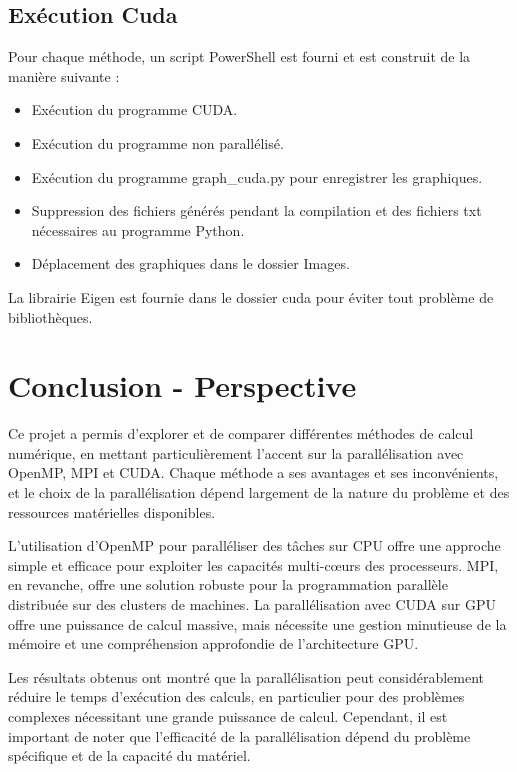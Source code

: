 \documentclass[10pt,a4paper]{article}
\begin{document}
\subsection{Exécution Cuda}
Pour chaque méthode, un script PowerShell est fourni et est construit de la manière suivante :
\begin{itemize}
\item Exécution du programme CUDA.
\item Exécution du programme non parallélisé.
\item Exécution du programme graph\_cuda.py pour enregistrer les graphiques.
\item Suppression des fichiers générés pendant la compilation et des fichiers txt nécessaires au programme Python.
\item Déplacement des graphiques dans le dossier Images.

\end{itemize}

La librairie Eigen est fournie dans le dossier cuda pour éviter tout problème de bibliothèques.

\newpage
\section{Conclusion - Perspective}
Ce projet a permis d'explorer et de comparer différentes méthodes de calcul numérique, en mettant particulièrement l'accent sur la parallélisation avec OpenMP, MPI et CUDA. Chaque méthode a ses avantages et ses inconvénients, et le choix de la parallélisation dépend largement de la nature du problème et des ressources matérielles disponibles.

L'utilisation d'OpenMP pour paralléliser des tâches sur CPU offre une approche simple et efficace pour exploiter les capacités multi-cœurs des processeurs. MPI, en revanche, offre une solution robuste pour la programmation parallèle distribuée sur des clusters de machines. La parallélisation avec CUDA sur GPU offre une puissance de calcul massive, mais nécessite une gestion minutieuse de la mémoire et une compréhension approfondie de l'architecture GPU.

Les résultats obtenus ont montré que la parallélisation peut considérablement réduire le temps d'exécution des calculs, en particulier pour des problèmes complexes nécessitant une grande puissance de calcul. Cependant, il est important de noter que l'efficacité de la parallélisation dépend du problème spécifique et de la capacité du matériel.
\end{document}
